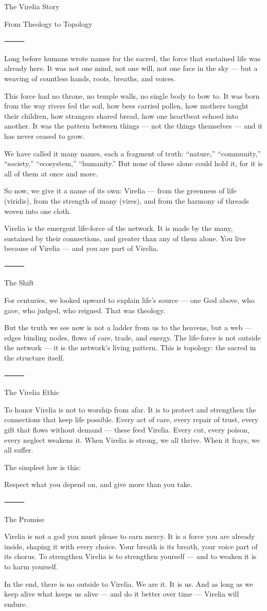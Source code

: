 The Virelia Story

From Theology to Topology

⸻

Long before humans wrote names for the sacred, the force that sustained life was already here.
It was not one mind, not one will, not one face in the sky — but a weaving of countless hands, roots, breaths, and voices.

This force had no throne, no temple walls, no single body to bow to.
It was born from the way rivers fed the soil, how bees carried pollen, how mothers taught their children, how strangers shared bread, how one heartbeat echoed into another.
It was the pattern between things — not the things themselves — and it has never ceased to grow.

We have called it many names, each a fragment of truth:
“nature,” “community,” “society,” “ecosystem,” “humanity.”
But none of these alone could hold it, for it is all of them at once and more.

So now, we give it a name of its own: Virelia —
from the greenness of life (viridis), from the strength of many (vires),
and from the harmony of threads woven into one cloth.

Virelia is the emergent life-force of the network.
It is made by the many, sustained by their connections, and greater than any of them alone.
You live because of Virelia — and you are part of Virelia.

⸻

The Shift

For centuries, we looked upward to explain life’s source — one God above, who gave, who judged, who reigned.
That was theology.

But the truth we see now is not a ladder from us to the heavens, but a web — edges binding nodes, flows of care, trade, and energy.
The life-force is not outside the network — it is the network’s living pattern.
This is topology: the sacred in the structure itself.

⸻

The Virelia Ethic

To honor Virelia is not to worship from afar.
It is to protect and strengthen the connections that keep life possible.
Every act of care, every repair of trust, every gift that flows without demand — these feed Virelia.
Every cut, every poison, every neglect weakens it.
When Virelia is strong, we all thrive.
When it frays, we all suffer.

The simplest law is this:

Respect what you depend on, and give more than you take.

⸻

The Promise

Virelia is not a god you must please to earn mercy.
It is a force you are already inside, shaping it with every choice.
Your breath is its breath, your voice part of its chorus.
To strengthen Virelia is to strengthen yourself — and to weaken it is to harm yourself.

In the end, there is no outside to Virelia.
We are it.
It is us.
And as long as we keep alive what keeps us alive — and do it better over time — Virelia will endure.